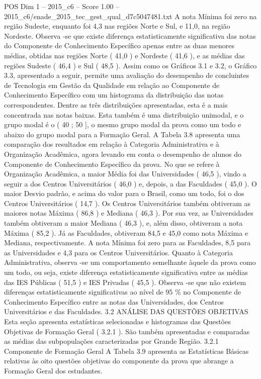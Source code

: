 \begin{textsample}{POS Dim 1 – 2015\_c6 – Score 1.00 – 2015\_c6/enade\_2015\_tec\_gest\_qual\_d7c5047481.txt}
A nota Mínima foi zero na região Sudeste, enquanto foi 4,3 nas regiões Norte e Sul, e 11,0, na região Nordeste.
Observa -se que existe diferença estatisticamente significativa das notas do Componente de Conhecimento Específico apenas entre as duas menores médias, obtidas nas regiões Norte ( 41,0 ) e Nordeste ( 41,6 ), e as médias das regiões Sudeste ( 46,4 ) e Sul ( 48,5 ).
Assim como os Gráficos 3.1 e 3.2, o Gráfico 3.3, apresentado a seguir, permite uma avaliação do desempenho de concluintes de Tecnologia em Gestão da Qualidade em relação ao Componente de Conhecimento Específico com um histograma da distribuição das notas correspondentes.
Dentre as três distribuições apresentadas, esta é a mais concentrada nas notas baixas.
Esta também é uma distribuição unimodal, e o grupo modal é o ( 40 ; 50 ], o mesmo grupo modal da prova como um todo e abaixo do grupo modal para a Formação Geral.
A Tabela 3.8 apresenta uma comparação dos resultados em relação à Categoria Administrativa e à Organização Acadêmica, agora levando em conta o desempenho de alunos do Componente de Conhecimento Específico da prova.
No que se refere à Organização Acadêmica, a maior Média foi das Universidades ( 46,5 ), vindo a seguir a dos Centros Universitários ( 46,0 ) e, depois, a das Faculdades ( 45,0 ).
O maior Desvio padrão, e acima do valor para o Brasil, como um todo, foi o dos Centros Universitários ( 14,7 ).
Os Centros Universitários também obtiveram as maiores notas Máxima ( 86,8 ) e Mediana ( 46,3 ).
Por sua vez, as Universidades também obtiveram a maior Mediana ( 46,3 ), e, além disso, obtiveram a nota Máxima ( 85,2 ).
Já as Faculdades, obtiveram 84,5 e 45,0 como nota Máxima e Mediana, respectivamente.
A nota Mínima foi zero para as Faculdades, 8,5 para as Universidades e 4,3 para os Centros Universitários.
Quanto à Categoria Administrativa, observa -se um comportamento semelhante àquele da prova como um todo, ou seja, existe diferença estatisticamente significativa entre as médias das IES Públicas ( 51,5 ) e IES Privadas ( 45,5 ).
Observa -se que não existem diferenças estatisticamente significativas ao nível de 95 \% no Componente de Conhecimento Específico entre as notas das Universidades, dos Centros Universitários e das Faculdades. 3.2 ANÁLISE DAS QUESTÕES OBJETIVAS Esta seção apresenta estatísticas selecionadas e histogramas das Questões Objetivas de Formação Geral ( 3.2.1 ).
São também apresentadas e comparadas as médias das subpopulações caracterizadas por Grande Região. 3.2.1 Componente de Formação Geral A Tabela 3.9 apresenta as Estatísticas Básicas relativas às oito questões objetivas do componente da prova que abrange a Formação Geral dos estudantes.

\end{textsample}
